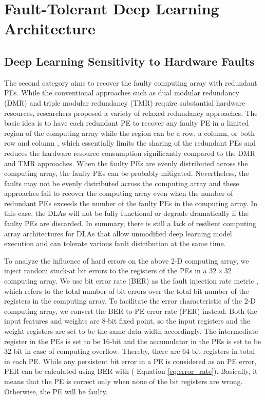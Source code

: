 \section{Fault-Tolerant Deep Learning Architecture}
\subsection{Deep Learning Sensitivity to Hardware Faults}
The second category aims to recover the faulty computing array with redundant PEs. While the conventional approaches such as dual modular redundancy (DMR) and triple modular redundancy (TMR) require substantial hardware resources, researchers proposed a variety of relaxed redundancy approaches. The basic idea is to have each redundant PE to recover any faulty PE in a limited region of the computing array while the region can be a row, a column, or both row and column \cite{takanami2012built} \cite{takanami2017built}, which essentially limits the sharing of the redundant PEs and reduces the hardware resource consumption significantly compared to the DMR and TMR approaches. When the faulty PEs are evenly distributed across the computing array, the faulty PEs can be probably mitigated. Nevertheless, the faults may not be evenly distributed across the computing array and these approaches fail to recover the computing array even when the number of redundant PEs exceeds the number of the faulty PEs in the computing array. In this case, the DLAs will not be fully functional or degrade dramatically if the faulty PEs are discarded. In summary, there is still a lack of resilient computing array architectures for DLAs that allow unmodified deep learning model execution and can tolerate various fault distribution at the same time. 

To analyze the influence of hard errors on the above 2-D computing array, we inject random stuck-at bit errors to the registers of the PEs in a $32 \times 32$ computing array. We use bit error rate (BER) as the fault injection rate metric \cite{mittal2020survey}\cite{neggaz2018reliability}\cite{ares2018dac}, which refers to the total number of bit errors over the total bit number of the registers in the computing array. To facilitate the error characteristic of the 2-D computing array, we convert the BER to PE error rate (PER) instead. Both the input features and weights are 8-bit fixed point, so the input registers and the weight registers are set to be the same data width accordingly. The intermediate register in the PEs is set to be 16-bit and the accumulator in the PEs is set to be 32-bit in case of computing overflow. Thereby, there are 64 bit registers in total in each PE. While any persistent bit error in a PE is considered as an PE error, PER can be calculated using BER with ( Equation \ref{eq:error_rate}). Basically, it means that the PE is correct only when none of the bit registers are wrong. Otherwise, the PE will be faulty.

